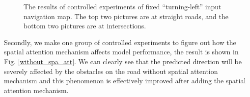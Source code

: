 \documentclass[letterpaper,10 pt,conference]{ieeeconf}  %
\begin{document}
\begin{figure}
{    }
    \caption{The results of controlled experiments of fixed ``turning-left'' input navigation map. The top two pictures are at straight roads, and the bottom two pictures are at intersections.}
    \label{set_navg_map}
\end{figure}

Secondly, we make one group of controlled experiments to figure out how the spatial attention mechanism affects model performance, the result is shown in Fig. \ref{without_spa_att}. We can clearly see that the predicted direction will be severely affected by the obstacles on the road without spatial attention mechanism and this phenomenon is effectively improved after adding the spatial attention mechanism.
\end{document}
